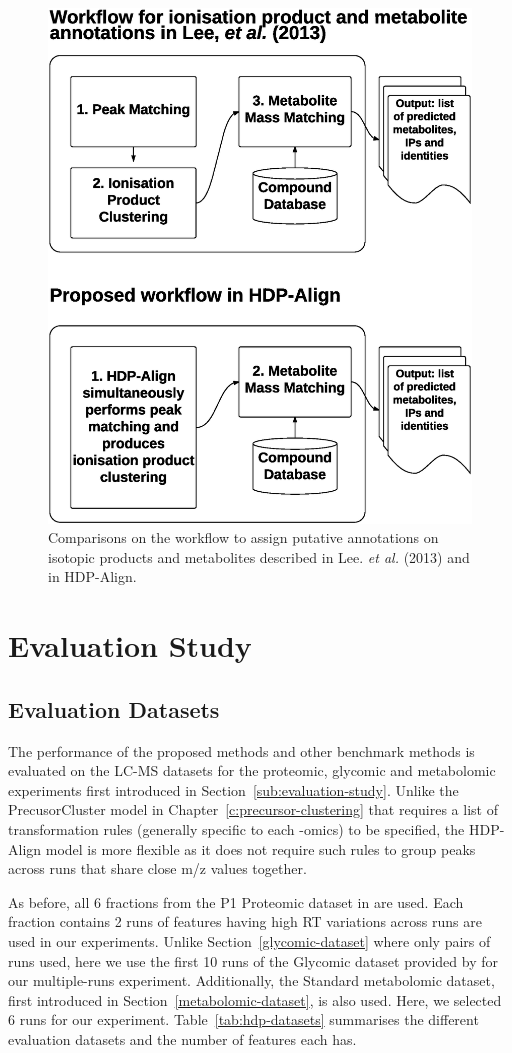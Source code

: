 \begin{figure}[!htbp]
\centering\includegraphics[width=0.5\linewidth]{06-hdp/figures/figure_3.eps}
\centering\caption{Comparisons on the workflow to assign putative annotations on isotopic products and metabolites described in Lee. \textit{et al.} (2013) \cite{Lee2013} and in HDP-Align.\label{fig-workflow}}
\end{figure}

\section{Evaluation Study}

\subsection{Evaluation Datasets}

The performance of the proposed methods and other benchmark methods is evaluated on the LC-MS datasets for the proteomic, glycomic and metabolomic experiments first introduced in Section~\ref{sub:evaluation-study}. Unlike the PrecusorCluster model in Chapter~\ref{c:precursor-clustering} that requires a list of transformation rules (generally specific to each -omics) to be specified, the HDP-Align model is more flexible as it does not require such rules to group peaks across runs that share close m/z values together. 

As before, all 6 fractions from the P1 Proteomic dataset in \cite{Lange2008} are used. Each fraction contains 2 runs of features having high \ac{RT} variations across runs are used in our experiments. Unlike Section~\ref{glycomic-dataset} where only pairs of runs used, here we use the first 10 runs of the Glycomic dataset provided by \cite{Tsai2013a} for our multiple-runs experiment. Additionally, the Standard metabolomic dataset, first introduced in Section~\ref{metabolomic-dataset}, is also used. Here, we selected 6 runs for our experiment.  Table~\ref{tab:hdp-datasets} summarises the different evaluation datasets and the number of features each has.


